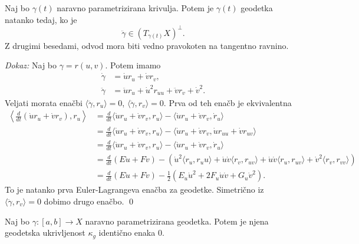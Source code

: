 \begin{izrek}
\label{izr_karakterizacija_geodetke_pri_naravni_parametrizaciji}
 Naj bo $\gamma(t)$ naravno parametrizirana krivulja. Potem je $\gamma(t)$ geodetka natanko tedaj, ko je \begin{equation*}
 \ddot{\gamma} \in (T_{\gamma(t)}X)^{\perp}.
 \end{equation*}  
Z drugimi besedami, odvod mora biti vedno pravokoten na tangentno ravnino.
\end{izrek}
\noindent
{\em Dokaz:\/}
Naj bo $\gamma = r(u,v)$. Potem imamo \begin{align*}
    \dot{\gamma} &= \dot{u} r_u + \dot{v} r_v ,\\
    \ddot{\gamma} &= \ddot{u} r_u + \dot{u}^2 r_{uu} + \ddot{v} r_v + \dot{v}^2.
\end{align*}
Veljati morata enačbi $\langle \ddot{\gamma}, r_u \rangle = 0$, $\langle \ddot{\gamma}, r_v \rangle  = 0$. Prva od teh enačb
je ekvivalentna \begin{align*}
    \left\langle \frac{d}{dt} (\dot{u} r_u + \dot{v} r_v), r_u \right\rangle  &= \frac{d}{dt}  \langle \dot{u} r_u + \dot{v} r_v, r_u \rangle - \langle \dot{u} r_u + \dot{v} r_v, \dot{r}_u \rangle \\
     &= \frac{d}{dt}  \langle \dot{u} r_u + \dot{v} r_v, r_u \rangle - \langle \dot{u} r_u + \dot{v} r_v, \dot{u} r_{uu} + \dot{v} r_{uv} \rangle \\
     &= \frac{d}{dt}  \langle \dot{u} r_u + \dot{v} r_v, r_u \rangle - \langle \dot{u} r_u + \dot{v} r_v, \dot{r}_u \rangle \\
     &= \frac{d}{dt} (E \dot{u} + F\dot{v}) - (\dot{u}^2 \langle r_u, r_uu \rangle + \dot{u} \dot{v} \langle r_v, r_{uv} \rangle + \dot{u} \dot{v} \langle r_u, r_{uv} \rangle + \dot{v}^2 \langle r_v, r_{vv}  \rangle  ) \\
     &= \frac{d}{dt}   (E \dot{u} + F\dot{v}) - \frac{1}{2} (E_u \dot{u}^2 + 2 F_u \dot{u} \dot{v} + G_u \dot{v}^2).
    \end{align*}
To je natanko prva Euler-Lagrangeva enačba za geodetke. Simetrično iz $\langle \ddot{\gamma}, r_v \rangle  = 0$ dobimo drugo enačbo.
\qed

\begin{posledica}
\label{psl_geodetksa_ukrivljenost_naravno_parametrziranih_geodetk_je_0}
Naj bo $\gamma: [a,b] \to X$ naravno parametrizirana geodetka. Potem je njena geodetska ukrivljenost $\kappa_g$ identično enaka $0$.
\end{posledica}

